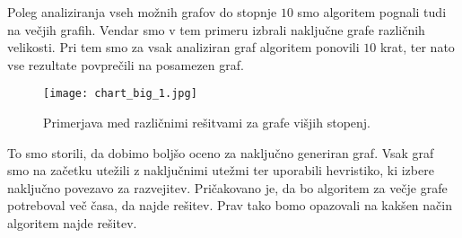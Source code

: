 \documentclass[12pt,a4paper,twoside]{article}
\theoremstyle{definition} %
\theoremstyle{plain} %
\numberwithin{equation}{section}  %
\begin{document}
Poleg analiziranja vseh možnih grafov do stopnje $10$ smo algoritem pognali tudi na večjih grafih. Vendar smo v tem primeru izbrali naključne grafe različnih velikosti. Pri tem smo za vsak analiziran graf algoritem ponovili $10$ krat, ter nato vse rezultate povprečili na posamezen graf.
 \begin{figure}[h!]
\caption{Primerjava med različnimi rešitvami za grafe višjih stopenj.}
\label{chart_big_1}
\centering
    \texttt{[image: chart\_big\_1.jpg]}
    \end{figure}
To smo storili, da dobimo boljšo oceno za naključno generiran graf. Vsak graf smo na začetku utežili z naključnimi utežmi ter uporabili hevristiko, ki izbere naključno povezavo za razvejitev. Pričakovano je, da bo algoritem za večje grafe potreboval več časa, da najde rešitev. Prav tako bomo opazovali na kakšen način algoritem najde rešitev. 
\end{document}
